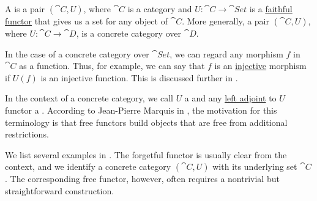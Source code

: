 \begin{definition}\label{def:concrete_category}
  A  is a pair \( (\cat{C}, U) \), where \( \cat{C} \) is a category and \( U: \cat{C} \to \cat{Set} \) is a \hyperref[def:functor_invertibility/faithful]{faithful functor} that gives us a set for any object of \( \cat{C} \). More generally, a pair \( (\cat{C}, U) \), where \( U: \cat{C} \to \cat{D} \), is a concrete category over \( \cat{D} \).

  In the case of a concrete category over \( \cat{Set} \), we can regard any morphism \( f \) in \( \cat{C} \) as a function. Thus, for example, we can say that \( f \) is an \hyperref[def:function_invertibility/injective]{injective} morphism if \( U(f) \) is an injective function. This is discussed further in .

  In the context of a concrete category, we call \( U \) a  and any \hyperref[def:category_adjunction]{left adjoint} to \( U \) functor a . According to Jean-Pierre Marquis in \cite{StanfordPlato:category_theory}, the motivation for this terminology is that free functors build objects that are free from additional restrictions.

  We list several examples in . The forgetful functor is usually clear from the context, and we identify a concrete category \( (\cat{C}, U) \) with its underlying set \( \cat{C} \). The corresponding free functor, however, often requires a nontrivial but straightforward construction.
\end{definition}

